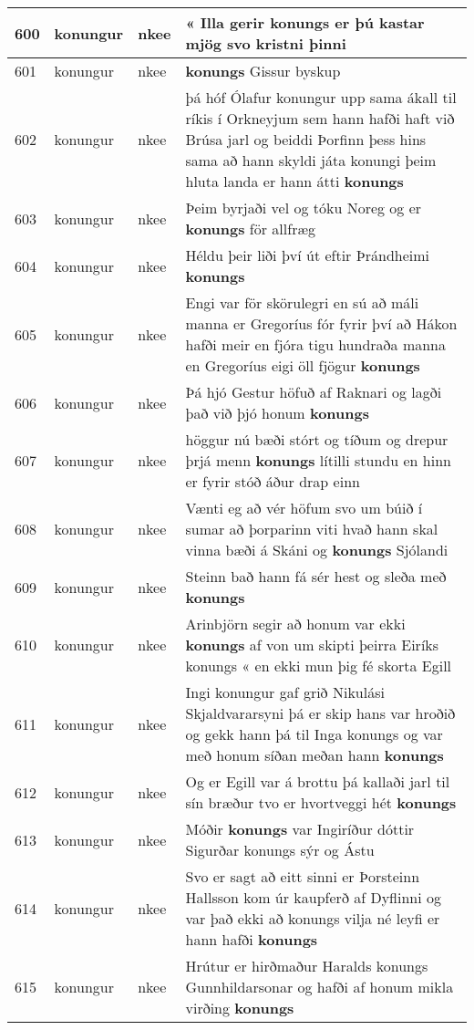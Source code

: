 \documentclass{article}
\begin{document}
\begin{longtable}{p{1cm}|p{1cm}|p{1cm}|p{13cm}}
\hline
600&konungur&nkee&« Illa gerir \textbf{konungs} er þú kastar mjög svo kristni þinni\\
\hline
601&konungur&nkee& \textbf{konungs} Gissur byskup\\
\hline
602&konungur&nkee&þá hóf Ólafur konungur upp sama ákall til ríkis í Orkneyjum sem hann hafði haft við Brúsa jarl og beiddi Þorfinn þess hins sama að hann skyldi játa konungi þeim hluta landa er hann átti \textbf{konungs} \\
\hline
603&konungur&nkee&Þeim byrjaði vel og tóku Noreg og er \textbf{konungs} för allfræg\\
\hline
604&konungur&nkee&Héldu þeir liði því út eftir Þrándheimi \textbf{konungs} \\
\hline
605&konungur&nkee&Engi var för skörulegri en sú að máli manna er Gregoríus fór fyrir því að Hákon hafði meir en fjóra tigu hundraða manna en Gregoríus eigi öll fjögur \textbf{konungs} \\
\hline
606&konungur&nkee&Þá hjó Gestur höfuð af Raknari og lagði það við þjó honum \textbf{konungs} \\
\hline
607&konungur&nkee&höggur nú bæði stórt og tíðum og drepur þrjá menn \textbf{konungs} lítilli stundu en hinn er fyrir stóð áður drap einn\\
\hline
608&konungur&nkee&Vænti eg að vér höfum svo um búið í sumar að þorparinn viti hvað hann skal vinna bæði á Skáni og \textbf{konungs} Sjólandi\\
\hline
609&konungur&nkee&Steinn bað hann fá sér hest og sleða með \textbf{konungs} \\
\hline
610&konungur&nkee&Arinbjörn segir að honum var ekki \textbf{konungs} af von um skipti þeirra Eiríks konungs « en ekki mun þig fé skorta Egill\\
\hline
611&konungur&nkee&Ingi konungur gaf grið Nikulási Skjaldvararsyni þá er skip hans var hroðið og gekk hann þá til Inga konungs og var með honum síðan meðan hann \textbf{konungs} \\
\hline
612&konungur&nkee&Og er Egill var á brottu þá kallaði jarl til sín bræður tvo er hvortveggi hét \textbf{konungs} \\
\hline
613&konungur&nkee&Móðir \textbf{konungs} var Ingiríður dóttir Sigurðar konungs sýr og Ástu\\
\hline
614&konungur&nkee&Svo er sagt að eitt sinni er Þorsteinn Hallsson kom úr kaupferð af Dyflinni og var það ekki að konungs vilja né leyfi er hann hafði \textbf{konungs} \\
\hline
615&konungur&nkee&Hrútur er hirðmaður Haralds konungs Gunnhildarsonar og hafði af honum mikla virðing \textbf{konungs} \\

\end{longtable}
\end{document}
